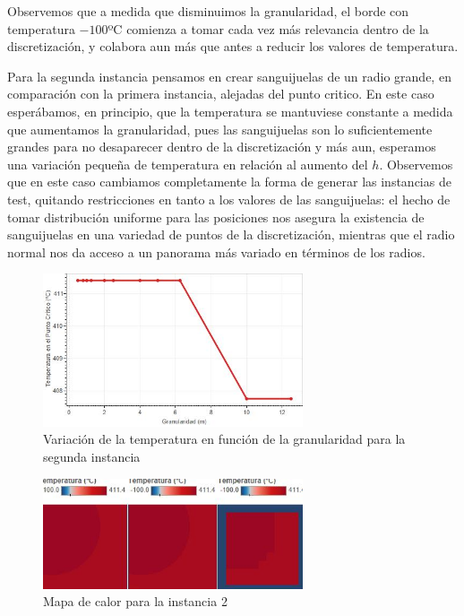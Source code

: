 Observemos que a medida que disminuimos la granularidad, el borde con temperatura $-100$ºC comienza a tomar cada vez más relevancia dentro de la discretización, y colabora aun más que antes a reducir los valores de temperatura.

Para la segunda instancia pensamos en crear sanguijuelas de un radio grande, en comparación con la primera instancia, alejadas del punto critico. En este caso esperábamos, en principio, que la temperatura se mantuviese constante a medida que aumentamos la granularidad, pues las sanguijuelas son lo suficientemente grandes para no desaparecer dentro de la discretización y más aun, esperamos una variación pequeña de temperatura en relación al aumento del $h$. Observemos que en este caso cambiamos completamente la forma de generar las instancias de test, quitando restricciones en tanto a los valores de las sanguijuelas: el hecho de tomar distribución uniforme para las posiciones nos asegura la existencia de sanguijuelas en una variedad de puntos de la discretización, mientras que el radio normal nos da acceso a un panorama más variado en términos de los radios.

\begin{figure}[h]
    \centering
    \includegraphics[width=0.685\textwidth]{experimento 1-2}
    \caption{Variación de la temperatura en función de la granularidad para la segunda instancia}
    \label{fig:exp12}
\end{figure}

\begin{figure}[h]
    \centering
    \includegraphics[width=0.685\textwidth]{Ejemplo Instancia 2}
    \caption{Mapa de calor para la instancia 2}
    \label{fig:exp12-vis}
\end{figure}

